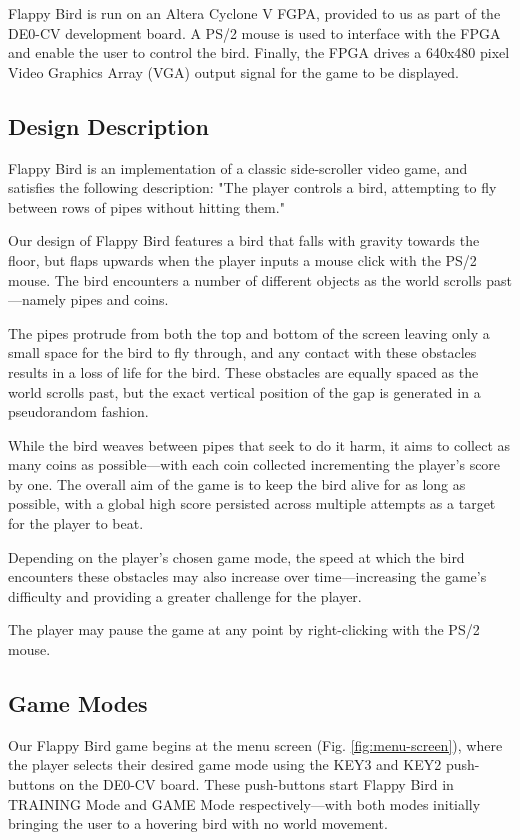\documentclass[conference]{IEEEtran}
\begin{document}
Flappy Bird is run on an Altera Cyclone V FGPA, provided to us as part of the DE0-CV development board. A PS/2 mouse is used to interface with the FPGA and enable the user to control the bird. Finally, the FPGA drives a 640x480 pixel Video Graphics Array (VGA) output signal for the game to be displayed.

\subsection{Design Description}

Flappy Bird is an implementation of a classic side-scroller video game, and satisfies the following description: "The player controls a bird, attempting to fly between rows of pipes without hitting them."

Our design of Flappy Bird features a bird that falls with gravity towards the floor, but flaps upwards when the player inputs a mouse click with the PS/2 mouse. The bird encounters a number of different objects as the world scrolls past—namely pipes and coins.

The pipes protrude from both the top and bottom of the screen leaving only a small space for the bird to fly through, and any contact with these obstacles results in a loss of life for the bird. These obstacles are equally spaced as the world scrolls past, but the exact vertical position of the gap is generated in a pseudorandom fashion.

While the bird weaves between pipes that seek to do it harm, it aims to collect as many coins as possible—with each coin collected incrementing the player's score by one. The overall aim of the game is to keep the bird alive for as long as possible, with a global high score persisted across multiple attempts as a target for the player to beat.

Depending on the player's chosen game mode, the speed at which the bird encounters these obstacles may also increase over time—increasing the game's difficulty and providing a greater challenge for the player.

The player may pause the game at any point by right-clicking with the PS/2 mouse.

\subsection{Game Modes}

Our Flappy Bird game begins at the menu screen (Fig. \ref{fig:menu-screen}), where the player selects their desired game mode using the KEY3 and KEY2 push-buttons on the DE0-CV board. These push-buttons start Flappy Bird in TRAINING Mode and GAME Mode respectively—with both modes initially bringing the user to a hovering bird with no world movement.
\end{document}

